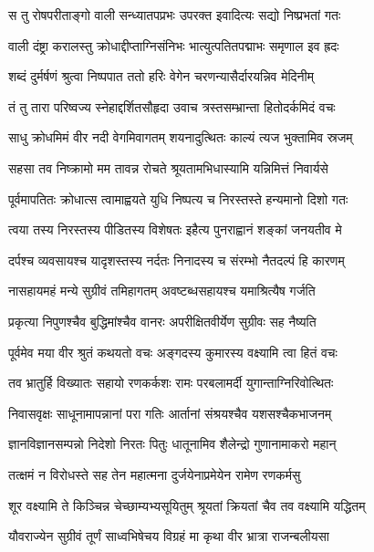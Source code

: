 \twolineshloka
{स तु रोषपरीताङ्गो वाली सन्ध्यातपप्रभः}
{उपरक्त इवादित्यः सद्यो निष्प्रभतां गतः} %

\twolineshloka
{वाली दंष्ट्रा करालस्तु क्रोधाद्दीप्ताग्निसंनिभः}
{भात्युत्पतितपद्माभः समृणाल इव ह्रदः} %

\twolineshloka
{शब्दं दुर्मर्षणं श्रुत्वा निष्पपात ततो हरिः}
{वेगेन चरणन्यासैर्दारयन्निव मेदिनीम्} %

\twolineshloka
{तं तु तारा परिष्वज्य स्नेहाद्दर्शितसौहृदा}
{उवाच त्रस्तसम्भ्रान्ता हितोदर्कमिदं वचः} %

\twolineshloka
{साधु क्रोधमिमं वीर नदी वेगमिवागतम्}
{शयनादुत्थितः काल्यं त्यज भुक्तामिव स्रजम्} %

\twolineshloka
{सहसा तव निष्क्रामो मम तावन्न रोचते}
{श्रूयतामभिधास्यामि यन्निमित्तं निवार्यसे} %

\twolineshloka
{पूर्वमापतितः क्रोधात्स त्वामाह्वयते युधि}
{निष्पत्य च निरस्तस्ते हन्यमानो दिशो गतः} %

\twolineshloka
{त्वया तस्य निरस्तस्य पीडितस्य विशेषतः}
{इहैत्य पुनराह्वानं शङ्कां जनयतीव मे} %

\twolineshloka
{दर्पश्च व्यवसायश्च यादृशस्तस्य नर्दतः}
{निनादस्य च संरम्भो नैतदल्पं हि कारणम्} %

\twolineshloka
{नासहायमहं मन्ये सुग्रीवं तमिहागतम्}
{अवष्टब्धसहायश्च यमाश्रित्यैष गर्जति} %

\twolineshloka
{प्रकृत्या निपुणश्चैव बुद्धिमांश्चैव वानरः}
{अपरीक्षितवीर्येण सुग्रीवः सह नैष्यति} %

\twolineshloka
{पूर्वमेव मया वीर श्रुतं कथयतो वचः}
{अङ्गदस्य कुमारस्य वक्ष्यामि त्वा हितं वचः} %

\twolineshloka
{तव भ्रातुर्हि विख्यातः सहायो रणकर्कशः}
{रामः परबलामर्दी युगान्ताग्निरिवोत्थितः} %

\twolineshloka
{निवासवृक्षः साधूनामापन्नानां परा गतिः}
{आर्तानां संश्रयश्चैव यशसश्चैकभाजनम्} %

\twolineshloka
{ज्ञानविज्ञानसम्पन्नो निदेशो निरतः पितुः}
{धातूनामिव शैलेन्द्रो गुणानामाकरो महान्} %

\twolineshloka
{तत्क्षमं न विरोधस्ते सह तेन महात्मना}
{दुर्जयेनाप्रमेयेन रामेण रणकर्मसु} %

\twolineshloka
{शूर वक्ष्यामि ते किञ्चिन्न चेच्छाम्यभ्यसूयितुम्}
{श्रूयतां क्रियतां चैव तव वक्ष्यामि यद्धितम्} %

\twolineshloka
{यौवराज्येन सुग्रीवं तूर्णं साध्वभिषेचय}
{विग्रहं मा कृथा वीर भ्रात्रा राजन्बलीयसा} %

